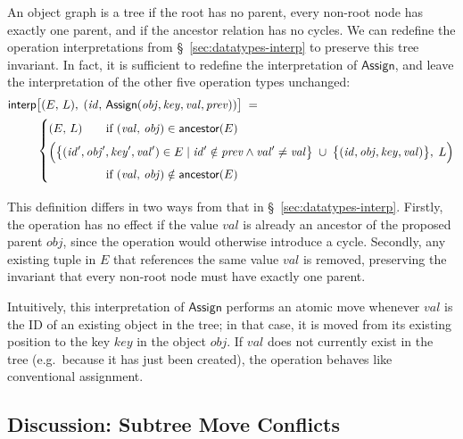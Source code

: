 An object graph is a tree if the root has no parent, every non-root node has exactly one parent, and if the ancestor relation has no cycles.
We can redefine the operation interpretations from \S~\ref{sec:datatypes-interp} to preserve this tree invariant.
In fact, it is sufficient to redefine the interpretation of $\mathsf{Assign}$, and leave the interpretation of the other five operation types unchanged:
\begin{align*}
    \mathsf{interp}&\big[(E,\, L),\; (\mathit{id},\, \mathsf{Assign}(\mathit{obj}, \mathit{key}, \mathit{val}, \mathit{prev})) \big] \;=\\
    & \left\{
    \arraycolsep=0pt \def\arraystretch{1.5}
    \begin{array}{l}
        (E,\, L) \qquad \text{if } (\mathit{val},\, \mathit{obj}) \in \mathsf{ancestor}(E) \\[2pt]
        \Big( \big\{ (\mathit{id}', \mathit{obj}', \mathit{key}', \mathit{val}') \in E \mid
        \mathit{id}' \notin \mathit{prev} \wedge \mathit{val}' \neq \mathit{val} \big\} \;\cup\;
        \big\{ (\mathit{id}, \mathit{obj}, \mathit{key}, \mathit{val}) \big\},\; L \Big) \\
        \hphantom{(E,\, L)} \qquad \text{if } (\mathit{val},\, \mathit{obj}) \notin \mathsf{ancestor}(E)
    \end{array} \right.
\end{align*}

This definition differs in two ways from that in \S~\ref{sec:datatypes-interp}.
Firstly, the operation has no effect if the value $\mathit{val}$ is already an ancestor of the proposed parent $\mathit{obj}$, since the operation would otherwise introduce a cycle.
Secondly, any existing tuple in $E$ that references the same value $\mathit{val}$ is removed, preserving the invariant that every non-root node must have exactly one parent.

Intuitively, this interpretation of $\mathsf{Assign}$ performs an atomic move whenever $\mathit{val}$ is the ID of an existing object in the tree; in that case, it is moved from its existing position to the key $\mathit{key}$ in the object $\mathit{obj}$.
If $\mathit{val}$ does not currently exist in the tree (e.g.\ because it has just been created), the operation behaves like conventional assignment.

\subsection{Discussion: Subtree Move Conflicts}

